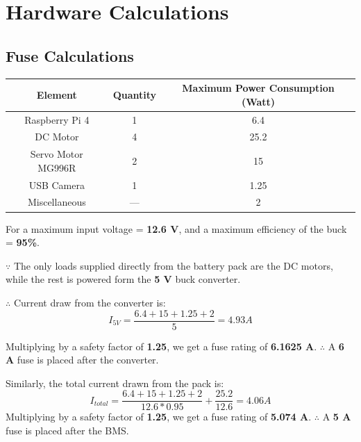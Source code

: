 \chapter{Hardware Calculations}
\section{Fuse Calculations}
\begin{center}
	\begin{tabular}{c|c|c}
		\toprule
		{\large Element} & {Quantity} & {\large Maximum Power Consumption (Watt)} \\\midrule
		{\large Raspberry Pi 4} & {\large 1} & {\large 6.4}\\
		{\large DC Motor} & {4} & {\large 25.2} \\
		{\large Servo Motor MG996R} & {\large 2} & {\large 15} \\
		{\large USB Camera} & {\large 1} & {\large 1.25} \\
		{\large Miscellaneous} &{\large ---} & {\large 2} \\ 
		\bottomrule
	\end{tabular}
\end{center}
For a maximum input voltage = \textbf{12.6 V}, and a maximum efficiency of the buck = \textbf{95\%}.

$\because$ The only loads supplied directly from the battery pack are the DC motors, while the rest is powered form the \textbf{5 V} buck converter.

$\therefore$ Current draw from the converter is:
\begin{equation}
	I_{5 V} = \frac{6.4 + 15 + 1.25 + 2}{5} = 4.93 A  
\end{equation}

Multiplying by a safety factor of \textbf{1.25}, we get a fuse rating of \textbf{6.1625 A}. $\therefore$ A \textbf{6 A} fuse is placed after the converter.

Similarly, the total current drawn from the pack is:
\begin{equation}
	I_{total} = \frac{6.4 + 15 + 1.25 + 2}{12.6 * 0.95} + \frac{25.2}{12.6} = 4.06 A  
\end{equation}
Multiplying by a safety factor of \textbf{1.25}, we get a fuse rating of \textbf{5.074 A}. $\therefore$ A \textbf{5 A} fuse is placed after the BMS.






